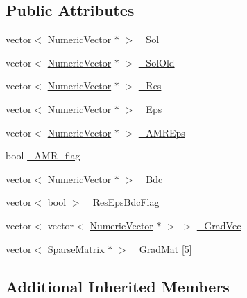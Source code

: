\subsection*{Public Attributes}
\begin{DoxyCompactItemize}
\item 
vector$<$ \mbox{\hyperlink{classfemus_1_1_numeric_vector}{Numeric\+Vector}} $\ast$ $>$ \mbox{\hyperlink{classfemus_1_1_solution_a9cabd7d3bf1b3dcb73d57a4e06e856a7}{\+\_\+\+Sol}}
\item 
vector$<$ \mbox{\hyperlink{classfemus_1_1_numeric_vector}{Numeric\+Vector}} $\ast$ $>$ \mbox{\hyperlink{classfemus_1_1_solution_a7ed557f571341f4ef1092310a40588ee}{\+\_\+\+Sol\+Old}}
\item 
vector$<$ \mbox{\hyperlink{classfemus_1_1_numeric_vector}{Numeric\+Vector}} $\ast$ $>$ \mbox{\hyperlink{classfemus_1_1_solution_aaaae28b34a0a3f70258767e30e5059f8}{\+\_\+\+Res}}
\item 
vector$<$ \mbox{\hyperlink{classfemus_1_1_numeric_vector}{Numeric\+Vector}} $\ast$ $>$ \mbox{\hyperlink{classfemus_1_1_solution_a64cdae4027573e1c070731027c9d3c95}{\+\_\+\+Eps}}
\item 
vector$<$ \mbox{\hyperlink{classfemus_1_1_numeric_vector}{Numeric\+Vector}} $\ast$ $>$ \mbox{\hyperlink{classfemus_1_1_solution_aa471aebee151033f022c807554d25409}{\+\_\+\+A\+M\+R\+Eps}}
\item 
bool \mbox{\hyperlink{classfemus_1_1_solution_a816938e425db8a87dfa897bbae63fcae}{\+\_\+\+A\+M\+R\+\_\+flag}}
\item 
vector$<$ \mbox{\hyperlink{classfemus_1_1_numeric_vector}{Numeric\+Vector}} $\ast$ $>$ \mbox{\hyperlink{classfemus_1_1_solution_a09d44e7763e08f1a95cb38454ae903c8}{\+\_\+\+Bdc}}
\item 
vector$<$ bool $>$ \mbox{\hyperlink{classfemus_1_1_solution_aefb8528c702c13931c863711ee189b7e}{\+\_\+\+Res\+Eps\+Bdc\+Flag}}
\item 
vector$<$ vector$<$ \mbox{\hyperlink{classfemus_1_1_numeric_vector}{Numeric\+Vector}} $\ast$ $>$ $>$ \mbox{\hyperlink{classfemus_1_1_solution_a27fa400ad65ad9f6632f38c168842bb5}{\+\_\+\+Grad\+Vec}}
\item 
vector$<$ \mbox{\hyperlink{classfemus_1_1_sparse_matrix}{Sparse\+Matrix}} $\ast$ $>$ \mbox{\hyperlink{classfemus_1_1_solution_a14cdad148f6f5eeb19126201760df71a}{\+\_\+\+Grad\+Mat}} \mbox{[}5\mbox{]}
\end{DoxyCompactItemize}
\subsection*{Additional Inherited Members}


